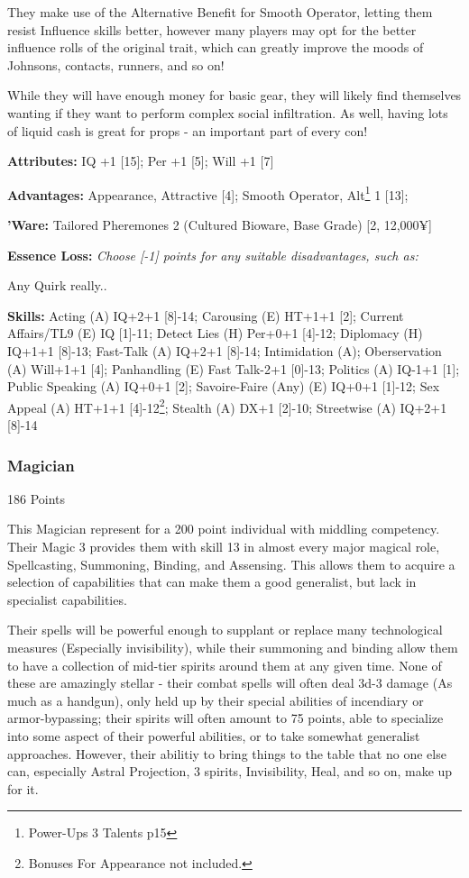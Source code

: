 \begin{multicols*}{2}
	They make use of the Alternative Benefit for Smooth Operator, letting them resist Influence skills better, however many players may opt for the better influence rolls of the original trait, which can greatly improve the moods of Johnsons, contacts, runners, and so on!
	
	While they will have enough money for basic gear, they will likely find themselves wanting if they want to perform complex social infiltration. As well, having lots of liquid cash is great for props - an important part of every con!
	
	\textbf{Attributes: }
	IQ +1 [15]; Per +1 [5]; Will +1 [7]
	
	\textbf{Advantages: }
	Appearance, Attractive [4]; Smooth Operator, Alt\footnote{Power-Ups 3 Talents p15} 1 [13]; 
	
	\textbf{'Ware:}
	Tailored Pheremones 2 (Cultured Bioware, Base Grade) [2, 12,000¥]
	
	\textbf{Essence Loss:}
	\textit{Choose [-1] points for any suitable disadvantages, such as:}
	
	Any Quirk really..
	
	\textbf{Skills: } Acting (A) IQ+2+1 [8]-14; Carousing (E) HT+1+1 [2]; Current Affairs/TL9 (E) IQ [1]-11; Detect Lies (H) Per+0+1 [4]-12; Diplomacy (H) IQ+1+1 [8]-13; Fast-Talk (A) IQ+2+1 [8]-14; Intimidation (A); Oberservation (A) Will+1+1 [4]; Panhandling (E) Fast Talk-2+1 [0]-13; Politics (A) IQ-1+1 [1]; Public Speaking (A) IQ+0+1 [2]; Savoire-Faire (Any) (E) IQ+0+1 [1]-12; Sex Appeal (A) HT+1+1 [4]-12\footnote{Bonuses For Appearance not included.}; Stealth (A) DX+1 [2]-10; Streetwise (A) IQ+2+1 [8]-14
	
	
	\subsubsection{Magician}
	\begin{flushright}
		186 Points
	\end{flushright}
	
	This Magician represent for a 200 point individual with middling competency. Their Magic 3 provides them with skill 13 in almost every major magical role, Spellcasting, Summoning, Binding, and Assensing. This allows them to acquire a selection of capabilities that can make them a good generalist, but lack in specialist capabilities. 
	
	Their spells will be powerful enough to supplant or replace many technological measures (Especially invisibility), while their summoning and binding allow them to have a collection of mid-tier spirits around them at any given time. None of these are amazingly stellar - their combat spells will often deal 3d-3 damage (As much as a handgun), only held up by their special abilities of incendiary or armor-bypassing; their spirits will often amount to 75 points, able to specialize into some aspect of their powerful abilities, or to take somewhat generalist approaches. However, their abilitiy to bring things to the table that no one else can, especially Astral Projection, 3 spirits, Invisibility, Heal, and so on, make up for it.
	

\end{multicols*}
